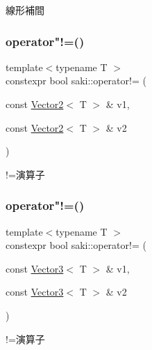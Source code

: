 線形補間 

\mbox{\label{namespacesaki_a6ff1956703c2dfeebb0d188d9c34b033}} 
\subsubsection{\texorpdfstring{operator"!=()}{operator!=()}\hspace{0.1cm}{\footnotesize\ttfamily [1/4]}}
{\footnotesize\ttfamily template$<$typename T $>$ \\
constexpr bool saki\+::operator!= (\begin{DoxyParamCaption}\item[{const \mbox{\hyperlink{classsaki_1_1_vector2}{Vector2}}$<$ T $>$ \&}]{v1,  }\item[{const \mbox{\hyperlink{classsaki_1_1_vector2}{Vector2}}$<$ T $>$ \&}]{v2 }\end{DoxyParamCaption})}



!=演算子 

\mbox{\label{namespacesaki_a49b3805c2b97e135606939b8d64eca20}} 
\subsubsection{\texorpdfstring{operator"!=()}{operator!=()}\hspace{0.1cm}{\footnotesize\ttfamily [2/4]}}
{\footnotesize\ttfamily template$<$typename T $>$ \\
constexpr bool saki\+::operator!= (\begin{DoxyParamCaption}\item[{const \mbox{\hyperlink{classsaki_1_1_vector3}{Vector3}}$<$ T $>$ \&}]{v1,  }\item[{const \mbox{\hyperlink{classsaki_1_1_vector3}{Vector3}}$<$ T $>$ \&}]{v2 }\end{DoxyParamCaption})}



!=演算子 

\mbox{\label{namespacesaki_a778d46d9fe6118407c686cc3c3c61ac7}} 
